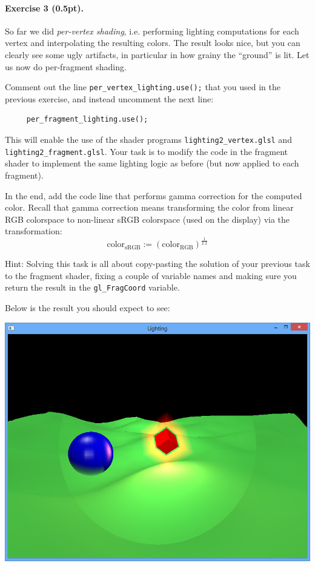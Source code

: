 \documentclass{article}
\newenvironment{exercise}[2]{\paragraph{Exercise #1 (#2pt).} }{
\medskip}
\begin{document}
\begin{exercise}{3}{0.5}
So far we did \emph{per-vertex shading}, i.e. performing lighting computations for each vertex and interpolating the resulting colors. The result looks nice, but you can clearly see some ugly artifacts, in particular in how grainy the ``ground'' is lit. Let us now do per-fragment shading.

\noindent
Comment out the line \verb#per_vertex_lighting.use();# that you used in the previous exercise, and instead uncomment the next line:
\begin{lstlisting}
	 per_fragment_lighting.use();     
\end{lstlisting}
This will enable the use of the shader programs \verb#lighting2_vertex.glsl# and \verb#lighting2_fragment.glsl#. Your task is to modify the code in the fragment shader to implement the same lighting logic as before (but now applied to each fragment). 

In the end, add the code line that performs gamma correction for the computed color. Recall that gamma correction means transforming the color from linear RGB colorspace to non-linear sRGB colorspace (used on the display) via the transformation:
$$
\text{color}_\text{sRGB} := \left(\text{color}_\text{RGB}\right)^\frac{1}{2.2}
$$

Hint: Solving this task is all about copy-pasting the solution of your previous task to the fragment shader, fixing a couple of variable names and making sure you return the result in the \verb#gl_FragCoord# variable.
\end{exercise}

Below is the result you should expect to see:
\begin{center}
\includegraphics[width=1.0\textwidth]{lighting2.png}
\end{center}
\end{document}
